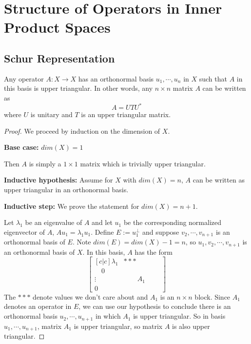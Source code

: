 \chapter{Structure of Operators in Inner Product Spaces}

\section{Schur Representation} 

\begin{theorem}
Any operator $A: X \rightarrow X$ has an orthonormal basis $u_{1}, \cdots, u_{n}$ in $X$ such that $A$ in this basis is upper triangular. In other words, any $n \times n$ matrix $A$ can be written as 
$$A = UTU^{*}$$
where $U$ is unitary and $T$ is an upper triangular matrix. 
\end{theorem}

\begin{proof}
We proceed by induction on the dimension of $X$. 

\textbf{Base case:} $dim(X) = 1$

Then $A$ is simply a $1 \times 1$ matrix which is trivially upper triangular. 

\textbf{Inductive hypothesis:} Assume for $X$ with $dim(X) = n$, $A$ can be written as upper triangular in an orthonormal basis. 

\textbf{Inductive step:} We prove the statement for $dim(X) = n + 1$. 

Let $\lambda_{1}$ be an eigenvalue of $A$ and let $u_{1}$ be the corresponding normalized eigenvector of $A$, $Au_{1} = \lambda_{1} u_{1}$. Define $E := u_{1}^{\perp}$ and suppose $v_{2}, \cdots, v_{n + 1}$ is an orthonormal basis of $E$. Note $dim(E) = dim(X) - 1 = n$, so $u_{1}, v_{2}, \cdots, v_{n + 1}$ is an orthonormal basis of $X$. In this basis, $A$ has the form 
$$\begin{bmatrix}[c|c]
\lambda_{1} & *** \\
\hline 
\quad 0 \quad &  \\
\vdots & \qquad A_{1} \qquad \\
0 & 
\end{bmatrix}
$$
The $***$ denote values we don't care about and $A_{1}$ is an $n \times n$ block. Since $A_{1}$ denotes an operator in $E$, we can use our hypothesis to conclude there is an orthonormal basis $u_{2}, \cdots, u_{n + 1}$ in which $A_{1}$ is upper triangular. So in basis $u_{1}, \cdots, u_{n + 1}$, matrix $A_{1}$ is upper triangular, so matrix $A$ is also upper triangular.
\end{proof}

